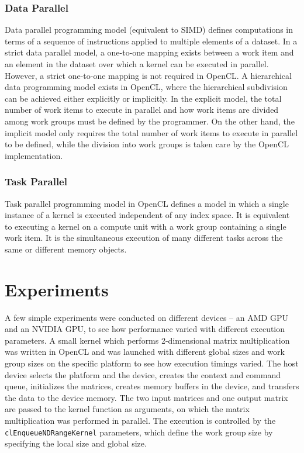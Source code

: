 \subsubsection{Data Parallel}
\label{sect4_1_4_1}
Data parallel programming model (equivalent to SIMD) defines computations in terms of a sequence of instructions applied to multiple elements of a dataset. In a strict data parallel model, a one-to-one mapping exists between a work item and an element in the dataset over which a kernel can be executed in parallel. However, a strict one-to-one mapping is not required in OpenCL. \newline\newline
A hierarchical data programming model exists in OpenCL, where the hierarchical subdivision can be achieved either explicitly or implicitly. In the explicit model, the total number of work items to execute in parallel and how work items are divided among work groups must be defined by the programmer. On the other hand, the implicit model only requires the total number of work items to execute in parallel to be defined, while the division into work groups is taken care by the OpenCL implementation.

\subsubsection{Task Parallel}
\label{sect4_1_4_2}
Task parallel programming model in OpenCL defines a model in which a single instance of a kernel is executed independent of any index space. It is equivalent to executing a kernel on a compute unit with a work group containing a single work item. It is the simultaneous execution of many different tasks across the same or different memory objects.

\section{Experiments}
\label{sect4_2}
A few simple experiments were conducted on different devices – an AMD GPU and an NVIDIA GPU, to see how performance varied with different execution parameters. A small kernel which performs 2-dimensional matrix multiplication was written in OpenCL and was launched with different global sizes and work group sizes on the specific platform to see how  execution timings varied. \newline\newline
The host device selects the platform and the device, creates the context and command queue, initializes the matrices, creates memory buffers in the device, and transfers the data to the device memory. The two input matrices and one output matrix are passed to the kernel function as arguments, on which the matrix multiplication was performed in parallel. The execution is controlled by the \verb|clEnqueueNDRangeKernel| parameters, which define the work group size by specifying the local size and global size.

